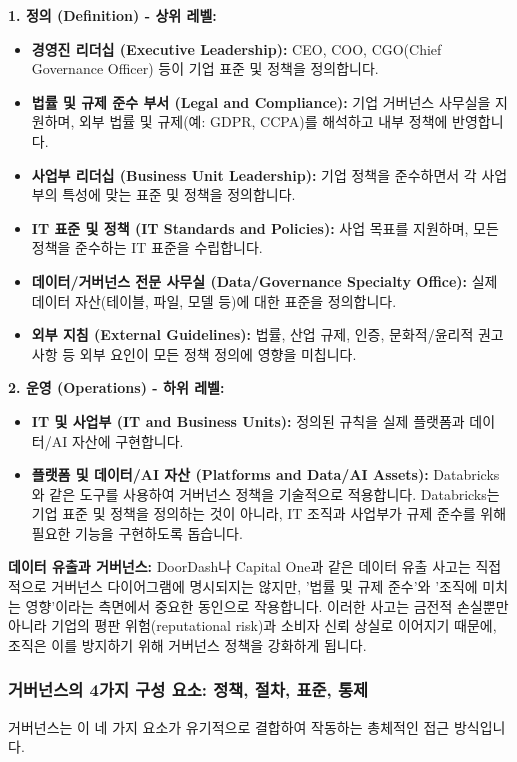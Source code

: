 \documentclass[11pt,a4paper]{article}
\theoremstyle{definition}
\begin{document}
\textbf{1. 정의 (Definition) - 상위 레벨:}
\begin{itemize}
    \item \textbf{경영진 리더십 (Executive Leadership):} CEO, COO, CGO(Chief Governance Officer) 등이 기업 표준 및 정책을 정의합니다.
    \item \textbf{법률 및 규제 준수 부서 (Legal and Compliance):} 기업 거버넌스 사무실을 지원하며, 외부 법률 및 규제(예: GDPR, CCPA)를 해석하고 내부 정책에 반영합니다.
    \item \textbf{사업부 리더십 (Business Unit Leadership):} 기업 정책을 준수하면서 각 사업부의 특성에 맞는 표준 및 정책을 정의합니다.
    \item \textbf{IT 표준 및 정책 (IT Standards and Policies):} 사업 목표를 지원하며, 모든 정책을 준수하는 IT 표준을 수립합니다.
    \item \textbf{데이터/거버넌스 전문 사무실 (Data/Governance Specialty Office):} 실제 데이터 자산(테이블, 파일, 모델 등)에 대한 표준을 정의합니다.
    \item \textbf{외부 지침 (External Guidelines):} 법률, 산업 규제, 인증, 문화적/윤리적 권고 사항 등 외부 요인이 모든 정책 정의에 영향을 미칩니다.
\end{itemize}

\textbf{2. 운영 (Operations) - 하위 레벨:}
\begin{itemize}
    \item \textbf{IT 및 사업부 (IT and Business Units):} 정의된 규칙을 실제 플랫폼과 데이터/AI 자산에 구현합니다.
    \item \textbf{플랫폼 및 데이터/AI 자산 (Platforms and Data/AI Assets):} Databricks와 같은 도구를 사용하여 거버넌스 정책을 기술적으로 적용합니다. Databricks는 기업 표준 및 정책을 정의하는 것이 아니라, IT 조직과 사업부가 규제 준수를 위해 필요한 기능을 구현하도록 돕습니다.
\end{itemize}

\begin{cautionbox}
\textbf{데이터 유출과 거버넌스:}
DoorDash나 Capital One과 같은 데이터 유출 사고는 직접적으로 거버넌스 다이어그램에 명시되지는 않지만, '법률 및 규제 준수'와 '조직에 미치는 영향'이라는 측면에서 중요한 동인으로 작용합니다. 이러한 사고는 금전적 손실뿐만 아니라 기업의 평판 위험(reputational risk)과 소비자 신뢰 상실로 이어지기 때문에, 조직은 이를 방지하기 위해 거버넌스 정책을 강화하게 됩니다.
\end{cautionbox}

\subsubsection*{거버넌스의 4가지 구성 요소: 정책, 절차, 표준, 통제}
거버넌스는 이 네 가지 요소가 유기적으로 결합하여 작동하는 총체적인 접근 방식입니다.
\end{document}
